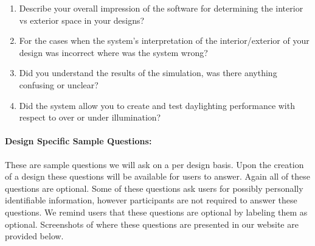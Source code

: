 \documentclass[12pt]{article}
\begin{document}
\begin{enumerate}
    \item Describe your overall impression of the software for determining the interior vs exterior space in your designs?
    \item For the cases when the system’s interpretation of the interior/exterior of your design was incorrect where was the system wrong? 
    \item Did you understand the results of the simulation, was there anything confusing or unclear?
    \item Did the system allow you to create and test daylighting performance with respect to over or under illumination?

      \end{enumerate}

\newpage

\paragraph{Design Specific Sample Questions:}
These are sample questions we will ask on a per design basis.
Upon the creation of a design these questions will be available for users to answer.
Again all of these questions are optional.
Some of these questions ask users for possibly personally identifiable information, however participants are not required to answer these questions. We remind users that these questions are optional by labeling them as optional.
Screenshots of where these questions are presented in our website are provided below.
\end{document}
